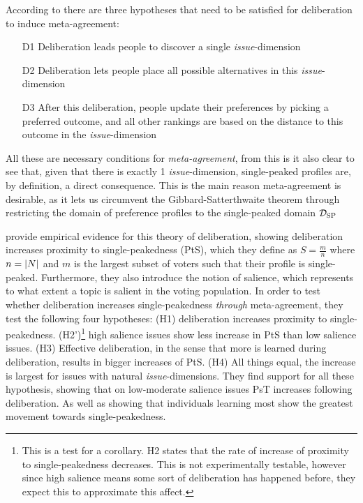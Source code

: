 According to \citet{listTwoConceptsAgreement2002} there are three hypotheses that need to be satisfied for deliberation to induce meta-agreement:
\begin{enumerate}
	\label{list:meta-agreement-checklist}
	\setlength\itemsep{1px}
	\item [D1] Deliberation leads people to discover a single \emph{issue}-dimension
	\item [D2] Deliberation lets people place all possible alternatives in this \emph{issue}-dimension
	\item [D3] After this deliberation, people update their preferences by picking
	      a preferred outcome, and all other rankings are based on the distance to this outcome in the \emph{issue}-dimension
\end{enumerate}

All these are necessary conditions for \emph{meta-agreement}, from this is it also clear to see that, given that there is exactly 1 \emph{issue}-dimension, single-peaked profiles are, by definition, a direct consequence. This is the main reason meta-agreement is desirable, as it lets us circumvent the Gibbard-Satterthwaite theorem \citep{gibbardManipulationVotingSchemes1973, satterthwaiteStrategyproofnessArrowsConditions1975} through restricting the domain of preference profiles to the single-peaked domain $\mathcal{D}_{\textnormal{SP}}$


\citet{listDeliberationSinglePeakednessPossibility2013} provide empirical evidence for this theory of deliberation, showing deliberation increases proximity to single-peakedness (PtS), which they define as $S= \frac{m}{n}$ where $n = |N|$ and $m$ is the largest subset of voters such that their profile is single-peaked. Furthermore, they also introduce the notion of salience, which represents to what extent a topic is salient in the voting population. In order to test whether deliberation increases single-peakedness \emph{through} meta-agreement, they test the following four hypotheses: (H1) deliberation increases proximity to single-peakedness. (H2')\footnote{This is a test for a corollary. H2 states that the rate of increase of proximity to single-peakedness decreases. This is not experimentally testable, however since high salience means some sort of deliberation has happened before, they expect this to approximate this affect.}
high salience issues show less increase in PtS than low salience issues. (H3) Effective deliberation, in the sense that more is learned during deliberation, results in bigger increases of PtS. (H4) All things equal, the increase is largest for issues with natural \emph{issue}-dimensions. They find support for all these hypothesis, showing that on low-moderate salience issues PsT increases following deliberation. As well as showing that individuals learning most show the greatest movement towards single-peakedness.

